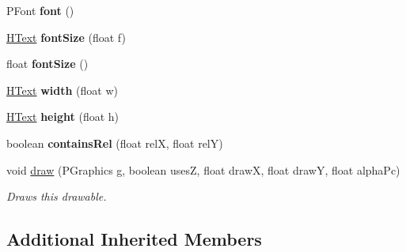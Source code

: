 \begin{DoxyCompactItemize}
\item 
\hypertarget{classhype_1_1extended_1_1drawable_1_1_h_text_ab8cb9c7ccd23080ffb61c04eef69736b}{P\-Font {\bfseries font} ()}\label{classhype_1_1extended_1_1drawable_1_1_h_text_ab8cb9c7ccd23080ffb61c04eef69736b}

\item 
\hypertarget{classhype_1_1extended_1_1drawable_1_1_h_text_addd6db9160f2a16a48ec2c98d7df909c}{\hyperlink{classhype_1_1extended_1_1drawable_1_1_h_text}{H\-Text} {\bfseries font\-Size} (float f)}\label{classhype_1_1extended_1_1drawable_1_1_h_text_addd6db9160f2a16a48ec2c98d7df909c}

\item 
\hypertarget{classhype_1_1extended_1_1drawable_1_1_h_text_a0724526739ec54a7634bb575ce2345d2}{float {\bfseries font\-Size} ()}\label{classhype_1_1extended_1_1drawable_1_1_h_text_a0724526739ec54a7634bb575ce2345d2}

\item 
\hypertarget{classhype_1_1extended_1_1drawable_1_1_h_text_a7013b6d524715ca3655adc3ff14ecc31}{\hyperlink{classhype_1_1extended_1_1drawable_1_1_h_text}{H\-Text} {\bfseries width} (float w)}\label{classhype_1_1extended_1_1drawable_1_1_h_text_a7013b6d524715ca3655adc3ff14ecc31}

\item 
\hypertarget{classhype_1_1extended_1_1drawable_1_1_h_text_a3746dbc04cb348b235ab70d653e1d41d}{\hyperlink{classhype_1_1extended_1_1drawable_1_1_h_text}{H\-Text} {\bfseries height} (float h)}\label{classhype_1_1extended_1_1drawable_1_1_h_text_a3746dbc04cb348b235ab70d653e1d41d}

\item 
\hypertarget{classhype_1_1extended_1_1drawable_1_1_h_text_a302d7a125313b353a536817dcc906e88}{boolean {\bfseries contains\-Rel} (float rel\-X, float rel\-Y)}\label{classhype_1_1extended_1_1drawable_1_1_h_text_a302d7a125313b353a536817dcc906e88}

\item 
void \hyperlink{classhype_1_1extended_1_1drawable_1_1_h_text_acff0face36490c9482ad0c536a9612d3}{draw} (P\-Graphics g, boolean uses\-Z, float draw\-X, float draw\-Y, float alpha\-Pc)
\begin{DoxyCompactList}\small\item\em Draws this drawable. \end{DoxyCompactList}\end{DoxyCompactItemize}
\subsection*{Additional Inherited Members}


